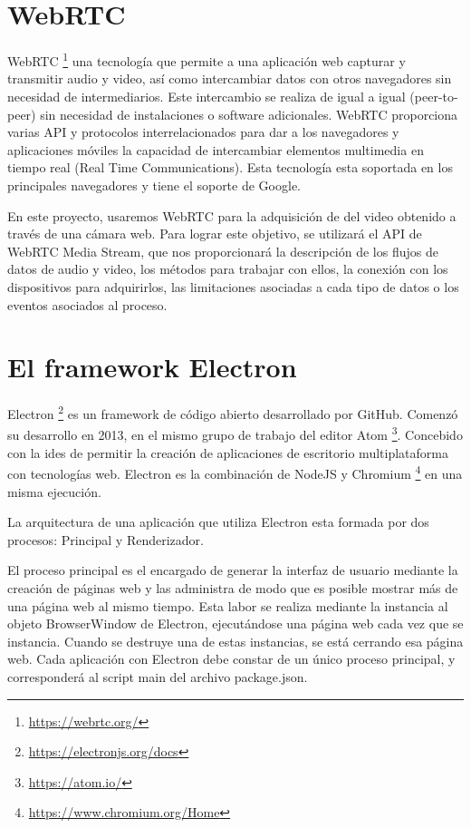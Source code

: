 \section{WebRTC}
WebRTC \footnote{\url{https://webrtc.org/}}  una tecnología que permite a una aplicación web capturar y transmitir audio y video, así como intercambiar datos con otros navegadores sin necesidad de intermediarios. Este intercambio se realiza de igual a igual (peer-to-peer) sin necesidad de instalaciones o software adicionales. WebRTC proporciona varias API y protocolos interrelacionados para dar a los navegadores y aplicaciones móviles la capacidad de intercambiar elementos multimedia en tiempo real (Real Time Communications). Esta tecnología esta soportada en los principales navegadores y tiene el soporte de Google.

En este proyecto, usaremos WebRTC para la adquisición de del video obtenido a través de una cámara web. Para lograr este objetivo, se utilizará el API de WebRTC Media Stream, que nos proporcionará la descripción de los flujos de datos de audio y video, los métodos para trabajar con ellos, la conexión con los dispositivos para adquirirlos, las limitaciones asociadas a cada tipo de datos o los eventos asociados al proceso.

\section{El framework Electron}
Electron \footnote{\url{https://electronjs.org/docs}}  es un framework de código abierto desarrollado por GitHub. Comenzó su desarrollo en 2013, en el mismo grupo de trabajo del editor Atom \footnote{\url{https://atom.io/}}. Concebido con la ides de permitir la creación de aplicaciones de escritorio multiplataforma con tecnologías web. Electron es la combinación de NodeJS y Chromium \footnote{\url{https://www.chromium.org/Home}} en una misma ejecución.

La arquitectura de una aplicación que utiliza Electron esta formada por dos procesos: Principal y Renderizador. 

El proceso principal es el encargado de generar la interfaz de usuario mediante la creación de páginas web y las administra de modo que es posible mostrar más de una página web al mismo tiempo. Esta labor se realiza mediante la instancia al objeto BrowserWindow de Electron, ejecutándose una página web cada vez que se instancia. Cuando se destruye una de estas instancias, se está cerrando esa página web. Cada aplicación con Electron debe constar de un único proceso principal, y corresponderá al script main del archivo package.json.

